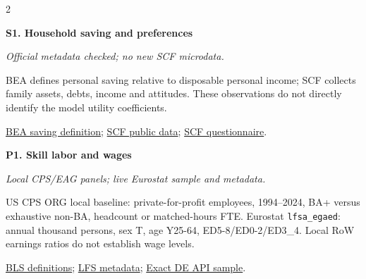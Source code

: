\documentclass[10pt,a4paper,landscape]{article}
\newcommand{\code}[1]{{\footnotesize\texttt{#1}}}
\begin{document}
\begin{multicols}{2}\raggedright

\noindent\begin{minipage}{\linewidth}\raggedright

\hypertarget{src-S1}{\textbf{S1. Household saving and preferences}}\par

{\footnotesize\itshape Official metadata checked; no new SCF microdata.}\par

BEA defines personal saving relative to disposable personal income; SCF collects family assets, debts, income and attitudes. These observations do not directly identify the model utility coefficients.

\par \href{https://www.bea.gov/news/pio-release-additional-information}{BEA saving definition}; \href{https://www.federalreserve.gov/econres/scfindex.htm}{SCF public data}; \href{https://www.federalreserve.gov/econres/files/scfoutline.2022.pdf}{SCF questionnaire}.

\end{minipage}\par\vspace{6pt}

\noindent\begin{minipage}{\linewidth}\raggedright

\hypertarget{src-P1}{\textbf{P1. Skill labor and wages}}\par

{\footnotesize\itshape Local CPS/EAG panels; live Eurostat sample and metadata.}\par

US CPS ORG local baseline: private-for-profit employees, 1994--2024, BA+ versus exhaustive non-BA, headcount or matched-hours FTE. Eurostat \code{lfsa\_egaed}: annual thousand persons, sex T, age Y25-64, ED5-8/ED0-2/ED3\_4. Local RoW earnings ratios do not establish wage levels.

\par \href{https://www.bls.gov/cps/definitions.htm}{BLS definitions}; \href{https://ec.europa.eu/eurostat/cache/metadata/en/lfsa_esms.htm}{LFS metadata}; \href{https://ec.europa.eu/eurostat/api/dissemination/statistics/1.0/data/lfsa_egaed?lang=en&freq=A&unit=THS_PER&sex=T&age=Y25-64&isced11=ED5-8&geo=DE&sinceTimePeriod=2021&untilTimePeriod=2023}{Exact DE API sample}.

\end{minipage}\par\vspace{6pt}


\end{multicols}
\end{document}
